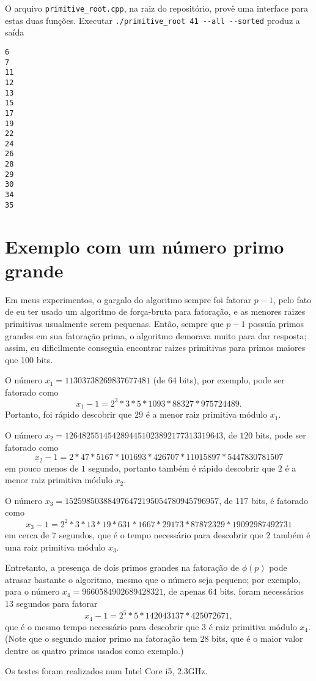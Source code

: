 \documentclass{article}
\theoremstyle{definition}
\begin{document}
O arquivo \verb"primitive_root.cpp",
na raiz do repositório,
provê uma interface para estas duas funções.
Executar \verb"./primitive_root 41 --all --sorted" produz a saída
\begin{verbatim}
6
7
11
12
13
15
17
19
22
24
26
28
29
30
34
35
\end{verbatim}

\section{Exemplo com um número primo grande}

Em meus experimentos,
o gargalo do algoritmo sempre foi fatorar $p-1$,
pelo fato de eu ter usado um algoritmo de força-bruta para fatoração,
e as menores raizes primitivas usualmente serem pequenas.
Então,
sempre que $p-1$ possuía primos grandes em sua fatoração prima,
o algoritmo demorava muito para dar resposta;
assim,
eu dificilmente conseguia encontrar raizes primitivas
para primos maiores que 100 bits.

O número $x_1 = 11303738269837677481$ (de $64$ bits), por exemplo,
pode ser fatorado como
\begin{equation*}
    x_1 - 1 = 2^3 * 3 * 5 * 1093 * 88327 * 975724489.
\end{equation*}
Portanto, foi rápido descobrir que $29$ é a menor raiz primitiva módulo $x_1$.

O número $x_2 = 1264825514542894451023892177313319643$, de $120$ bits,
pode ser fatorado como
\begin{equation*}
    x_2 - 1 = 2 * 47 * 5167 * 101693 * 426707 * 11015897 * 5447830781507
\end{equation*}
em pouco menos de $1$ segundo,
portanto também é rápido descobrir que $2$ é a menor raiz primitiva módulo $x_2$.

O número $x_3 = 152598503884976472195054780945796957$, de 117 bits,
é fatorado como
\begin{equation*}
    x_3 - 1 = 2^2 * 3 * 13 * 19 * 631 * 1667 * 29173 * 87872329 * 19092987492731
\end{equation*}
em cerca de $7$ segundos,
que é o tempo necessário para descobrir que $2$ também é uma raiz primitiva módulo $x_3$.

Entretanto, a presença de dois primos grandes na fatoração de $\phi(p)$
pode atrasar bastante o algoritmo,
mesmo que o número seja pequeno;
por exemplo,
para o número $x_4 = 9660584902689428321$,
de apenas $64$ bits,
foram necessários $13$ segundos para fatorar
\begin{equation*}
    x_4 - 1 = 2^5 * 5 * 142043137 * 425072671,
\end{equation*}
que é o mesmo tempo necessário para descobrir que $3$ é raiz primitiva módulo $x_4$.
(Note que o segundo maior primo na fatoração tem $28$ bits,
que é o maior valor dentre os quatro primos usados como exemplo.)

Os testes foram realizados num Intel Core i5, 2.3GHz.



\end{document}
